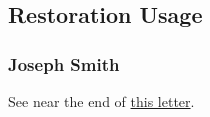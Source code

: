 \subsection{Restoration Usage} %
	\label{SONSOFPERDITION-RESTORATION}

	\subsubsection{Joseph Smith} %
		\label{SONSOFPERDITION-JS}
	
		\begin{compactdesc}
			\item[DATE/SOURCE] See near the end of \hyperref[EMS-1833-JS-25-JUN-1833]{this letter}.
		\end{compactdesc}
	
	
	

	
		
